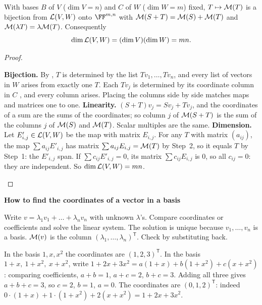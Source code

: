 \documentclass[10pt]{scrartcl}
\newenvironment{methodbox}[1]{\begin{mdframed}[style=methodstyle]\textbf{\color{NavyBlue}#1}\par\vspace{2pt}}{\end{mdframed}}
\begin{document}
\begin{proposition*}
  With bases $B$ of $V$ ($\dim V=n$) and $C$ of $W$ ($\dim W=m$) fixed, $T\mapsto\mathcal M(T)$ is a bijection from $\mathcal L(V,W)$ onto $\FF^{m,n}$ with $\mathcal M(S+T)=\mathcal M(S)+\mathcal M(T)$ and $\mathcal M(\lambda T)=\lambda\mathcal M(T)$. Consequently
  \[
    \dim\mathcal L(V,W) = (\dim V)(\dim W) = mn.
  \]
\end{proposition*}
\begin{proof}
  \begin{steps}
    \ii \textbf{Bijection.} By , $T$ is determined by the list $Tv_1,\dots,Tv_n$, and every list of vectors in $W$ arises from exactly one $T$. Each $Tv_j$ is determined by its coordinate column in $C$ , and every column arises. Placing the columns side by side matches maps and matrices one to one.
    \ii \textbf{Linearity.} $(S+T)v_j=Sv_j+Tv_j$, and the coordinates of a sum are the sums of the coordinates; so column $j$ of $\mathcal M(S+T)$ is the sum of the columns $j$ of $\mathcal M(S)$ and $\mathcal M(T)$. Scalar multiples are the same.
    \ii \textbf{Dimension.} Let $E'_{i,j}\in\mathcal L(V,W)$ be the map with matrix $E_{i,j}$. For any $T$ with matrix $(a_{ij})$, the map $\sum a_{ij}E'_{i,j}$ has matrix $\sum a_{ij}E_{i,j}=\mathcal M(T)$ by Step~2, so it equals $T$ by Step~1: the $E'_{i,j}$ span. If $\sum c_{ij}E'_{i,j}=0$, its matrix $\sum c_{ij}E_{i,j}$ is $0$, so all $c_{ij}=0$: they are independent. So $\dim\mathcal L(V,W)=mn$.
  \end{steps}
\end{proof}

\begin{methodbox}{How to find the coordinates of a vector in a basis}
  \begin{steps}
    \ii Write $v=\lambda_1v_1+\dots+\lambda_nv_n$ with unknown $\lambda$'s.
    \ii Compare coordinates or coefficients and solve the linear system. The solution is unique because $v_1,\dots,v_n$ is a basis.
    \ii $\mathcal M(v)$ is the column $(\lambda_1,\dots,\lambda_n)^{\mathsf T}$. Check by substituting back.
  \end{steps}
\end{methodbox}

\begin{example*}
  In the basis $1,x,x^2$ the coordinates are $(1,2,3)^{\mathsf T}$. In the basis $1+x,\ 1+x^2,\ x+x^2$, write $1+2x+3x^2=a(1+x)+b(1+x^2)+c(x+x^2)$: comparing coefficients, $a+b=1$, $a+c=2$, $b+c=3$. Adding all three gives $a+b+c=3$, so $c=2$, $b=1$, $a=0$. The coordinates are $(0,1,2)^{\mathsf T}$: indeed $0\cdot(1+x)+1\cdot(1+x^2)+2(x+x^2)=1+2x+3x^2$.
\end{example*}
\end{document}
